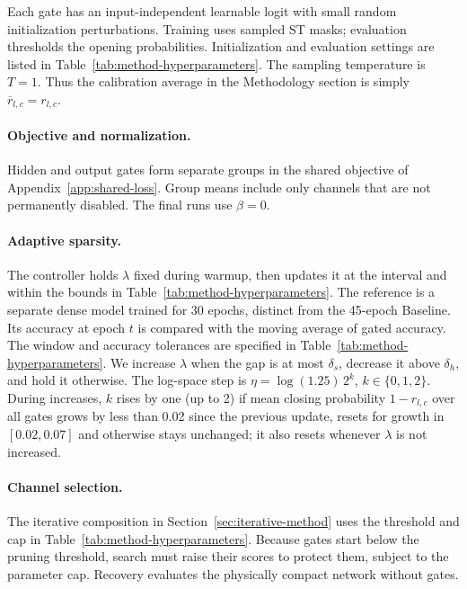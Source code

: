 Each gate has an input-independent learnable logit with small random
initialization perturbations. Training uses sampled ST masks;
evaluation thresholds the opening probabilities. Initialization and
evaluation settings are listed in Table~\ref{tab:method-hyperparameters}.
The sampling temperature is $T=1$. Thus the calibration average in the Methodology
section is simply $\overline r_{l,c}=r_{l,c}$.

\paragraph{Objective and normalization.}
Hidden and output gates form separate groups in the shared objective
of Appendix~\ref{app:shared-loss}. Group means include only channels
that are not permanently disabled. The final runs use $\beta=0$.

\paragraph{Adaptive sparsity.}
The controller holds $\lambda$ fixed during warmup, then updates it at
the interval and within the bounds in Table~\ref{tab:method-hyperparameters}.
The reference is a separate dense model trained for 30 epochs, distinct
from the 45-epoch Baseline. Its accuracy at epoch $t$ is compared with
the moving average of gated accuracy. The window and accuracy tolerances
are specified in Table~\ref{tab:method-hyperparameters}. We increase
$\lambda$ when the gap is at most $\delta_s$, decrease it above
$\delta_h$, and hold it otherwise.
The log-space step is
$\eta=\log(1.25)\,2^k$, $k\in\{0,1,2\}$. During increases, $k$
rises by one (up to 2) if mean closing probability $1-r_{l,c}$ over
all gates grows by less than 0.02 since the previous update, resets for growth in
$[0.02,0.07]$ and otherwise stays unchanged; it also resets whenever
$\lambda$ is not increased.

\paragraph{Channel selection.}
The iterative composition in Section~\ref{sec:iterative-method} uses the threshold and cap in
Table~\ref{tab:method-hyperparameters}.
Because gates start below the pruning threshold, search must raise their
scores to protect them, subject to the parameter cap. Recovery evaluates
the physically compact network without gates.

